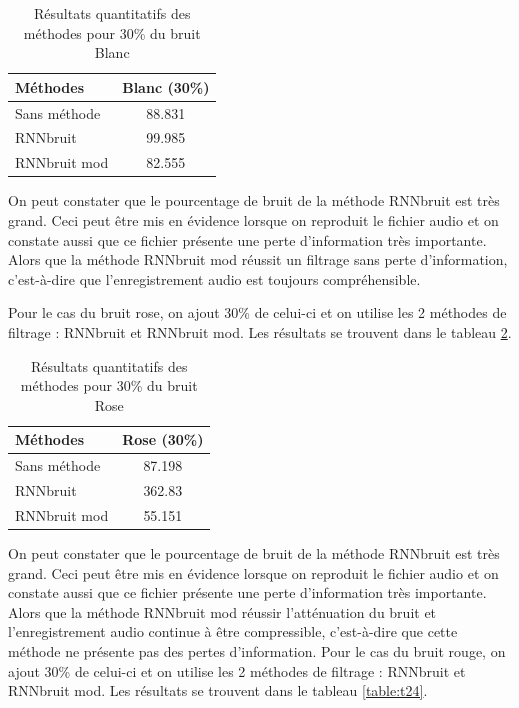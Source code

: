 \documentclass[conference,onecolumn]{IEEEtran}
\begin{document}
\begin{table}[H]
    \centering
    \begin{tabular}{ l  c }
    \textbf{Méthodes} & \textbf{Blanc (30\%)} \\
    \hline
    Sans méthode &  88.831\\
    RNNbruit &  99.985\\
    RNNbruit mod &  82.555\\
    \end{tabular}
    \caption{Résultats quantitatifs des méthodes pour 30\% du bruit Blanc}
    \label{table:t22}
\end{table}
On peut constater que le pourcentage de bruit de la méthode RNNbruit est très grand. Ceci peut être mis en  évidence lorsque on reproduit le fichier audio et on constate aussi que ce fichier présente une perte d’information très importante. Alors que la méthode RNNbruit mod réussit un filtrage sans perte d’information, c’est-à-dire que l’enregistrement audio est toujours compréhensible.

Pour le cas du bruit rose, on ajout 30\% de celui-ci et on utilise les 2 méthodes de filtrage : RNNbruit et RNNbruit mod. Les résultats se trouvent dans le tableau \ref{table:t23}.


\begin{table}[H]
    \centering
    \begin{tabular}{ l  c }
    \textbf{Méthodes} & \textbf{Rose (30\%)} \\
    \hline
    Sans méthode &  87.198\\
    RNNbruit &  362.83\\
    RNNbruit mod &  55.151\\
    \end{tabular}
    \caption{Résultats quantitatifs des méthodes pour 30\% du bruit Rose}
    \label{table:t23}
\end{table}
On peut constater que le pourcentage de bruit de la méthode RNNbruit est très grand. Ceci peut être mis en évidence lorsque on reproduit le fichier audio et on constate aussi que ce fichier présente une perte d’information très importante. Alors que la méthode RNNbruit mod réussir l’atténuation du bruit et l’enregistrement audio continue à être compressible, c’est-à-dire que cette méthode ne présente pas des pertes d’information. 
Pour le cas du bruit rouge, on ajout 30\% de celui-ci et on utilise les 2 méthodes de filtrage : RNNbruit et RNNbruit mod. Les résultats se trouvent dans le tableau \ref{table:t24}.
\end{document}

